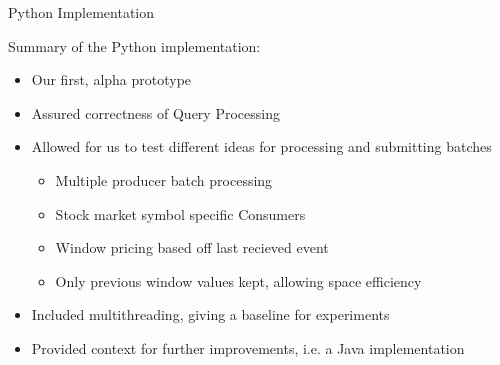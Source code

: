 \documentclass[9pt]{beamer}
\begin{document}
\begin{frame}[fragile]{ Python Implementation }


    Summary of the Python implementation:
    
    \begin{itemize}
        \item Our first, alpha prototype
        \item Assured correctness of Query Processing 
        \item Allowed for us to test different ideas for processing and submitting batches
            \begin{itemize}
                \item Multiple producer batch processing
                \item Stock market symbol specific Consumers
                \item Window pricing based off last recieved event
                \item Only previous window values kept, allowing space efficiency 
            \end{itemize}
        \item Included multithreading, giving a baseline for experiments
        \item Provided context for further improvements, i.e. a Java implementation

    \end{itemize}


    
\end{frame}

\end{document}
